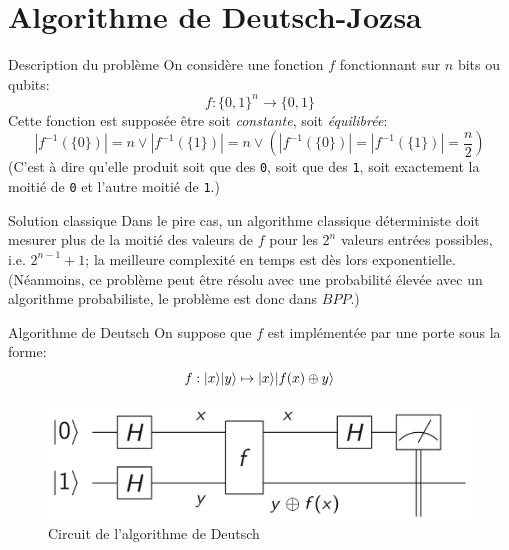 \documentclass[aspectratio=169]{beamer}
\theoremstyle{plain}
\theoremstyle{definition}
\DeclarePairedDelimiter\ket{\lvert}{\rangle}
\begin{document}
\section{Algorithme de Deutsch-Jozsa}
\begin{frame}{Description du problème}
    On considère une fonction $f$ fonctionnant sur $n$ bits ou qubits:
    \begin{equation*}
        f : \{ 0, 1 \}^n \to \{ 0, 1 \}
    \end{equation*}
    Cette fonction est supposée être soit \emph{constante}, soit \emph{équilibrée}:
    \begin{equation*}
        |f^{-1}(\{0\})| = n \lor |f^{-1}(\{1\})| = n \lor \left(|f^{-1}(\{0\})| = |f^{-1}(\{1\})| = \frac{n}{2}\right)
    \end{equation*}
    (C'est à dire qu'elle produit soit que des \texttt{0}, soit que des \texttt{1}, soit exactement la moitié de \texttt{0} et l'autre moitié de \texttt{1}.)
\end{frame}

\begin{frame}{Solution classique}
    Dans le pire cas, un algorithme classique déterministe doit mesurer plus de la moitié des valeurs de $f$ pour les $2^n$ valeurs entrées possibles, i.e. $2^{n-1}+1$; la meilleure complexité en temps est dès lors exponentielle. (Néanmoins, ce problème peut être résolu avec une probabilité élevée avec un algorithme probabiliste, le problème est donc dans $BPP$.)
\end{frame}

\begin{frame}{Algorithme de Deutsch}
    On suppose que $f$ est implémentée par une porte sous la forme:
    \begin{equation*}
        f : \ket{x}\ket{y} \mapsto \ket{x}\ket{f(x)\oplus y}
    \end{equation*}
    \begin{figure}[!ht]
        \centering
        \includegraphics[scale=0.4]{deutsch-circuit.png}
        \caption{Circuit de l'algorithme de Deutsch}
    \end{figure}
\end{frame}
\end{document}
